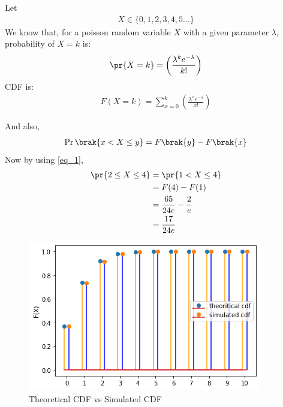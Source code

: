 
Let 
\begin{align}
	X\in \{0,1,2,3,4,5...\}
\end{align}
We know that, for a poisson random variable $X$ with a given parameter $\lambda$, probability of $X=k$ is:
\begin{align} \label{eq_0}
	\pr{X=k}=\left(\frac{\lambda^k e^{-\lambda}}{k!}\right)	
\end{align}
CDF is:
\begin{align}
    F(X=k)=\sum_{x=0}^{k}\left(\frac{\lambda^x e^{-\lambda}}{x!}\right)
\end{align}
   
And also,
\begin{align}
    \Pr\brak{x < X \le y} = F\brak{y} - F\brak{x}\label{eq_1}
\end{align}
Now by using \eqref{eq_1},
\begin{align}
    \pr{2 \leq X \leq 4} 
    & = \pr{1 < X \leq 4}\\
    & = F(4)-F(1)\\
    & = \frac{65}{24e}-\frac{2}{e}\\
    & = \frac{17}{24e}
\end{align}
\begin{figure}[ht]
    \centering
    \includegraphics[width=\columnwidth]{solutions/xe/2019/simulated_theoritical.png}
    \caption{Theoretical CDF vs Simulated CDF}
    \label{Figure_0}
\end{figure}